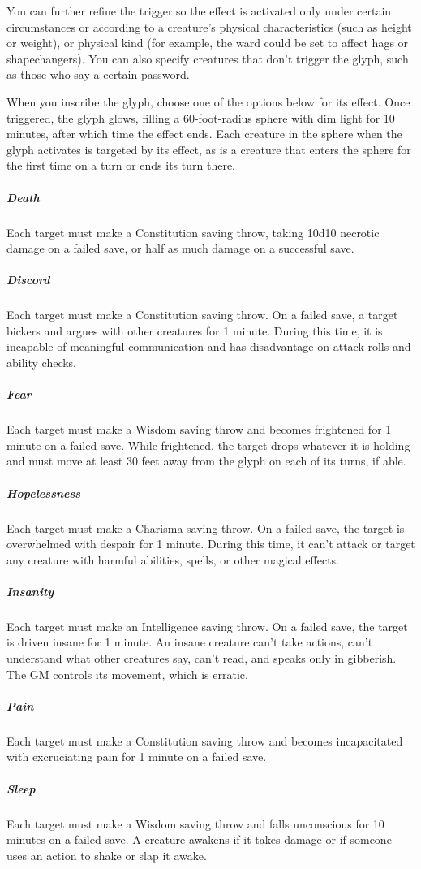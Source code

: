 You can further refine the trigger so the effect is activated only under certain circumstances or according to a creature’s physical characteristics (such as height or weight), or physical kind (for example, the ward could be set to affect hags or shapechangers). You can also specify creatures that don’t trigger the glyph, such as those who say a certain password.

When you inscribe the glyph, choose one of the options below for its effect. Once triggered, the glyph glows, filling a 60-foot-radius sphere with dim light for 10 minutes, after which time the effect ends. Each creature in the sphere when the glyph activates is targeted by its effect, as is a creature that enters the sphere for the first time on a turn or ends its turn there.

\subparagraph{Death} Each target must make a Constitution saving throw, taking 10d10 necrotic damage on a failed save, or half as much damage on a successful save.

\subparagraph{Discord} Each target must make a Constitution saving throw. On a failed save, a target bickers and argues with other creatures for 1 minute. During this time, it is incapable of meaningful communication and has disadvantage on attack rolls and ability checks.

\subparagraph{Fear} Each target must make a Wisdom saving throw and becomes frightened for 1 minute on a failed save. While frightened, the target drops whatever it is holding and must move at least 30 feet away from the glyph on each of its turns, if able.

\subparagraph{Hopelessness} Each target must make a Charisma saving throw. On a failed save, the target is overwhelmed with despair for 1 minute. During this time, it can’t attack or target any creature with harmful abilities, spells, or other magical effects.

\subparagraph{Insanity} Each target must make an Intelligence saving throw. On a failed save, the target is driven insane for 1 minute. An insane creature can’t take actions, can’t understand what other creatures say, can’t read, and speaks only in gibberish. The GM controls its movement, which is erratic.

\subparagraph{Pain} Each target must make a Constitution saving throw and becomes incapacitated with excruciating pain for 1 minute on a failed save.

\subparagraph{Sleep} Each target must make a Wisdom saving throw and falls unconscious for 10 minutes on a failed save. A creature awakens if it takes damage or if someone uses an action to shake or slap it awake.

